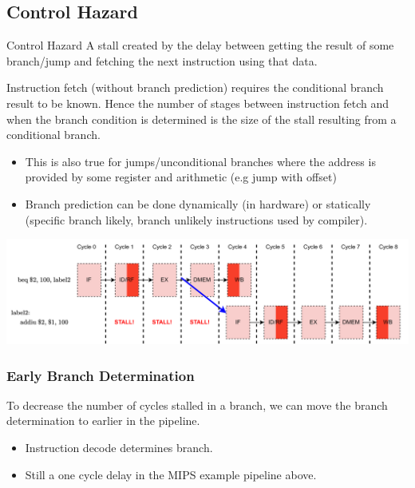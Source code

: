 \subsection{Control Hazard}
\begin{definitionbox}{Control Hazard}
	A stall created by the delay between getting the result of some branch/jump and fetching the next instruction using that data.
\end{definitionbox}
Instruction fetch (without branch prediction) requires the conditional branch result to be known. Hence the number of stages between instruction fetch and when the branch condition is determined is the size of the stall resulting from a conditional branch.
\begin{itemize}
	\item This is also true for jumps/unconditional branches where the address is provided by some register and arithmetic (e.g jump with offset)
	\item Branch prediction can be done dynamically (in hardware) or statically (specific branch likely, branch unlikely instructions used by compiler).
\end{itemize}
\begin{center}
	\includegraphics[width=.9\textwidth]{pipelining/images/control_hazard_conditional_branch.drawio.png}
\end{center}

\subsubsection{Early Branch Determination}
To decrease the number of cycles stalled in a branch, we can move the branch determination to earlier in the pipeline.
\begin{itemize}
	\item Instruction decode determines branch.
	\item Still a one cycle delay in the MIPS example pipeline above.
\end{itemize}

